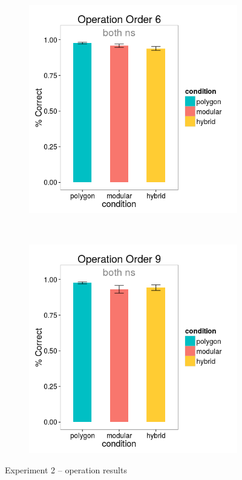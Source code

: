 \documentclass[man,10pt]{apa6}
\begin{document}
\begin{figure}[H]
\centering
\begin{subfigure}[c]{0.3\textwidth}
\centering
\includegraphics[width=\textwidth]{figures/2/op_6_r.png}
\end{subfigure}
~
\begin{subfigure}[c]{0.3\textwidth}
\centering
\includegraphics[width=\textwidth]{figures/2/op_9_r.png}
\end{subfigure}
\caption{Experiment 2 -- operation results}
\label{ex2_op}
\end{figure} 
\end{document}
